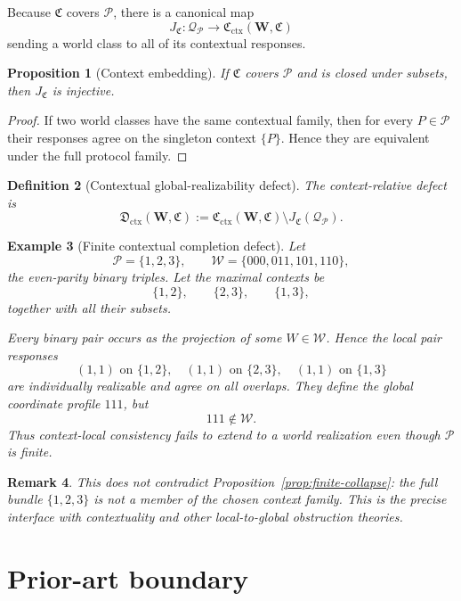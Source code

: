 \documentclass[11pt]{article}
\newtheorem{definition}{Definition}[section]
\newtheorem{proposition}[definition]{Proposition}
\newtheorem{example}[definition]{Example}
\newtheorem{remark}[definition]{Remark}
\newcommand{\W}{\mathcal W}
\newcommand{\Pcal}{\mathcal P}
\begin{document}
Because $\mathfrak C$ covers $\Pcal$, there is a canonical map
\[
J_{\mathfrak C}:\mathcal Q_{\Pcal}
\longrightarrow
\mathfrak C_{\mathrm{ctx}}(\mathbf W,\mathfrak C)
\]
sending a world class to all of its contextual responses.

\begin{proposition}[Context embedding]
If $\mathfrak C$ covers $\Pcal$ and is closed under subsets, then
$J_{\mathfrak C}$ is injective.
\end{proposition}

\begin{proof}
If two world classes have the same contextual family, then for every
$P\in\Pcal$ their responses agree on the singleton context $\{P\}$.
Hence they are equivalent under the full protocol family.
\end{proof}

\begin{definition}[Contextual global-realizability defect]
The context-relative defect is
\[
\mathfrak D_{\mathrm{ctx}}(\mathbf W,\mathfrak C)
:=
\mathfrak C_{\mathrm{ctx}}(\mathbf W,\mathfrak C)
\setminus
J_{\mathfrak C}(\mathcal Q_{\Pcal}).
\]
\end{definition}

\begin{example}[Finite contextual completion defect]
Let
\[
\Pcal=\{1,2,3\},
\qquad
\W=\{000,011,101,110\},
\]
the even-parity binary triples. Let the maximal contexts be
\[
\{1,2\},\qquad \{2,3\},\qquad \{1,3\},
\]
together with all their subsets.

Every binary pair occurs as the projection of some $W\in\W$. Hence the local
pair responses
\[
(1,1)\text{ on }\{1,2\},\quad
(1,1)\text{ on }\{2,3\},\quad
(1,1)\text{ on }\{1,3\}
\]
are individually realizable and agree on all overlaps. They define the global
coordinate profile $111$, but
\[
111\notin\W.
\]
Thus context-local consistency fails to extend to a world realization even
though $\Pcal$ is finite.
\end{example}

\begin{remark}
This does not contradict Proposition~\ref{prop:finite-collapse}: the full
bundle $\{1,2,3\}$ is not a member of the chosen context family. This is the
precise interface with contextuality and other local-to-global obstruction
theories.
\end{remark}

\section{Prior-art boundary}
\end{document}

